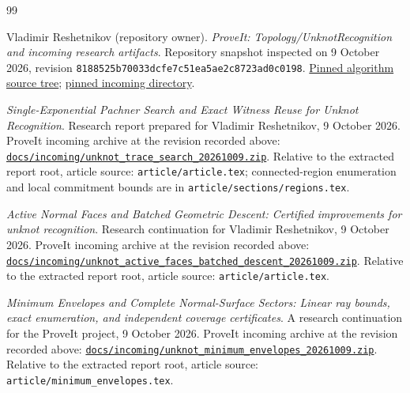 \clearpage
\begingroup
\fontsize{9.5}{11.2}\selectfont
\raggedright
\setlength{\parskip}{0pt}
\begin{thebibliography}{99}
\setlength{\itemsep}{2pt}

Vladimir Reshetnikov (repository owner).
\emph{ProveIt: Topology/UnknotRecognition and incoming research artifacts}.
Repository snapshot inspected on 9 October 2026, revision
\nolinkurl{8188525b70033dcfe7c51ea5ae2c8723ad0c0198}.
\href{https://github.com/VladimirReshetnikov/ProveIt/tree/8188525b70033dcfe7c51ea5ae2c8723ad0c0198/Topology/UnknotRecognition}{Pinned algorithm source tree};
\href{https://github.com/VladimirReshetnikov/ProveIt/tree/8188525b70033dcfe7c51ea5ae2c8723ad0c0198/docs/incoming}{pinned incoming directory}.

\emph{Single-Exponential Pachner Search and Exact Witness Reuse for Unknot
Recognition}.
Research report prepared for Vladimir Reshetnikov, 9 October 2026.
ProveIt incoming archive at the revision recorded above:
\href{https://github.com/VladimirReshetnikov/ProveIt/blob/8188525b70033dcfe7c51ea5ae2c8723ad0c0198/docs/incoming/unknot_trace_search_20261009.zip}{\nolinkurl{docs/incoming/unknot_trace_search_20261009.zip}}.
Relative to the extracted report root, article source:
\nolinkurl{article/article.tex};
connected-region enumeration and local commitment bounds are in
\nolinkurl{article/sections/regions.tex}.

\emph{Active Normal Faces and Batched Geometric Descent:
Certified improvements for unknot recognition}.
Research continuation for Vladimir Reshetnikov, 9 October 2026.
ProveIt incoming archive at the revision recorded above:
\href{https://github.com/VladimirReshetnikov/ProveIt/blob/8188525b70033dcfe7c51ea5ae2c8723ad0c0198/docs/incoming/unknot_active_faces_batched_descent_20261009.zip}{\nolinkurl{docs/incoming/unknot_active_faces_batched_descent_20261009.zip}}.
Relative to the extracted report root, article source:
\nolinkurl{article/article.tex}.

\emph{Minimum Envelopes and Complete Normal-Surface Sectors:
Linear ray bounds, exact enumeration, and independent coverage certificates}.
A research continuation for the ProveIt project, 9 October 2026.
ProveIt incoming archive at the revision recorded above:
\href{https://github.com/VladimirReshetnikov/ProveIt/blob/8188525b70033dcfe7c51ea5ae2c8723ad0c0198/docs/incoming/unknot_minimum_envelopes_20261009.zip}{\nolinkurl{docs/incoming/unknot_minimum_envelopes_20261009.zip}}.
Relative to the extracted report root, article source:
\nolinkurl{article/minimum_envelopes.tex}.


\end{thebibliography}
